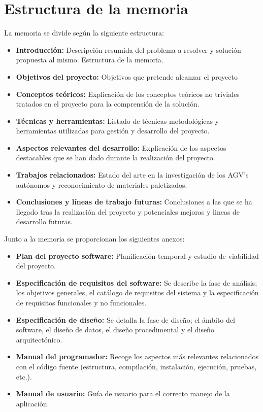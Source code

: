 \section{Estructura de la memoria}
La memoria se divide según la siguiente estructura:
\begin{itemize}
\tightlist
\item
  \textbf{Introducción:} Descripción  resumida del problema a resolver y solución propuesta al mismo. 
Estructura de la memoria.
\item
  \textbf{Objetivos del proyecto:} Objetivos que pretende alcanzar el proyecto
\item
  \textbf{Conceptos teóricos:} Explicación de los conceptos teóricos no triviales tratados en el proyecto para la comprensión de la solución.
\item
  \textbf{Técnicas y herramientas:} Listado de técnicas metodológicas y
  herramientas utilizadas para gestión y desarrollo del proyecto.
\item
  \textbf{Aspectos relevantes del desarrollo:} Explicación de los aspectos
  destacables que se han dado durante la realización del proyecto.
\item
  \textbf{Trabajos relacionados:} Estado del arte en la investigación de los AGV's autónomos y reconocimiento de materiales paletizados.
\item
  \textbf{Conclusiones y líneas de trabajo futuras:} Conclusiones
  a las que se ha llegado tras la realización del proyecto y potenciales mejoras y lineas de desarrollo futuras.
\end{itemize}
\newpage
Junto a la memoria se proporcionan los siguientes anexos:

\begin{itemize}
\tightlist
\item
  \textbf{Plan del proyecto software:} Planificación temporal y estudio
  de viabilidad del proyecto.
\item
  \textbf{Especificación de requisitos del software:} Se describe la
  fase de análisis; los objetivos generales, el catálogo de requisitos
  del sistema y la especificación de requisitos funcionales y no
  funcionales.
\item
  \textbf{Especificación de diseño:} Se detalla la fase de diseño; el
  ámbito del software, el diseño de datos, el diseño procedimental y el
  diseño arquitectónico.
\item
  \textbf{Manual del programador:} Recoge los aspectos más relevantes
  relacionados con el código fuente (estructura, compilación,
  instalación, ejecución, pruebas, etc.).
\item
  \textbf{Manual de usuario:} Guía de usuario para el correcto manejo de
  la aplicación.
\end{itemize}


